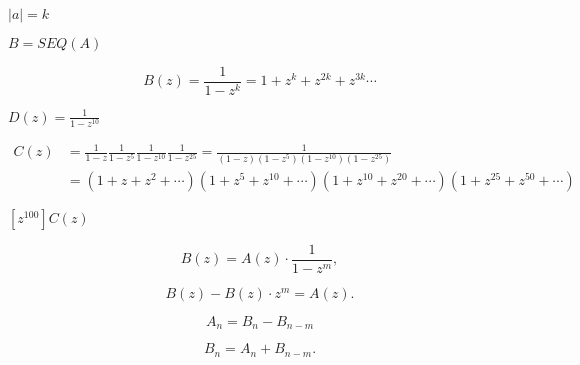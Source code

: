 \documentclass[10pt]{book}
\begin{document}
\begin{mdSnippets}
\begin{mdInlineSnippet}%
$|a|=k$\end{mdInlineSnippet}%
\begin{mdInlineSnippet}[15af214fd464bd95c3425b8abb68159e]%
$B=SEQ(A)$\end{mdInlineSnippet}%
\begin{mdDisplaySnippet}%
\[%
B(z) = \frac{1}{1-z^k}=1+z^k+z^{2k}+z^{3k}\cdots
\]%
\end{mdDisplaySnippet}%
\begin{mdInlineSnippet}%
$D(z)=\frac{1}{1-z^{10}}$\end{mdInlineSnippet}%
\begin{mdDisplaySnippet}[2e6e301c4cec00c0d0a1ae25194b04dd]%
\[%
\begin{aligned} 
C(z)&=\frac{1}{1-z}\frac{1}{1-z^5}\frac{1}{1-z^{10}}\frac{1}{1-z^{25}}
    =\frac{1}{(1-z)(1-z^5)(1-z^{10})(1-z^{25})}\\
    &=(1+z+z^2+\cdots)(1 + z^5 + z^{10} + \cdots)(1 + z^{10}+z^{20}+\cdots)(
      1+z^{25}+z^{50} + \cdots)
\end{aligned}
\]%
\end{mdDisplaySnippet}%
\begin{mdInlineSnippet}[d01a6119f94a8fdc0d5bd229fb83ae2e]%
$[z^{100}]C(z)$\end{mdInlineSnippet}%
\begin{mdDisplaySnippet}%
\[%
  B(z) = A(z)\cdot \dfrac{1}{1-z^m},
\]%
\end{mdDisplaySnippet}%
\begin{mdDisplaySnippet}[a6fb95e866a04275d0946577fb57b4f0]%
\[%
  B(z) - B(z)\cdot z^m = A(z).
\]%
\end{mdDisplaySnippet}%
\begin{mdDisplaySnippet}[7d7737db137d60eac1826bc867b6ca39]%
\[%
  A_n = B_n - B_{n-m}
\]%
\end{mdDisplaySnippet}%
\begin{mdDisplaySnippet}[0b5732306bd8a0333d448333e4c33593]%
\[%
  B_n = A_n + B_{n - m}.
\]
\end{mdDisplaySnippet}
\end{mdSnippets}
\end{document}
